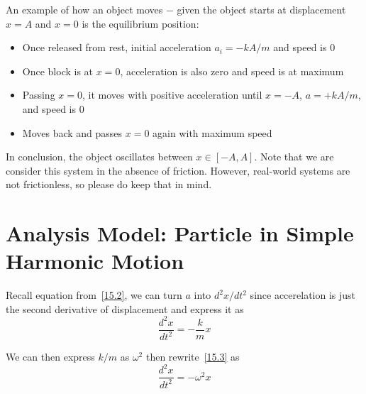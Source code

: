 An example of how an object moves $-$ given the object starts at displacement $x=A$ and $x=0$ is the
equilibrium position:
\begin{itemize}
    \item Once released from rest, initial acceleration $a_i = -kA/m$ and speed is 0
    \item Once block is at $x=0$, acceleration is also zero and speed is at maximum
    \item Passing $x=0$, it moves with positive acceleration until $x=-A$, $a = +kA/m$, and speed is 0
    \item Moves back and passes $x=0$ again with maximum speed
\end{itemize}

In conclusion, the object oscillates between $x \in [-A, A]$. Note that we are consider this system
in the absence of friction. However, real-world systems are not frictionless, so please do keep that in mind.

\section{Analysis Model: Particle in Simple Harmonic Motion}

Recall equation from~\eqref{15.2}, we can turn $a$ into $d^2x / dt^2$ since accerelation is just
the second derivative of displacement and express it as
\begin{equation}\label{15.3}
    \frac{d^2x}{dt^2} = -\frac{k}{m}x
\end{equation}

We can then express $k/m$ as $\omega^2$ then rewrite~\eqref{15.3} as 
\begin{equation}\label{15.5}
    \frac{d^2x}{dt^2} = - \omega^2 x
\end{equation}

